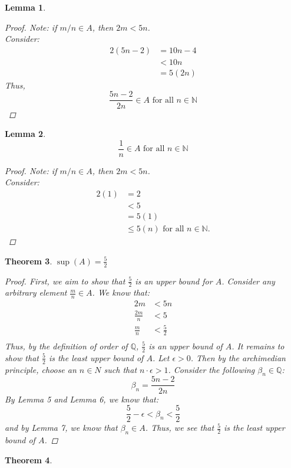 \documentclass{amsart}
\newtheorem{theorem}{Theorem}
\newtheorem{lemma}[theorem]{Lemma}
\begin{document}
\begin{enumerate}[1.]
\begin{lemma}
\[	\]
	\begin{proof}
		Note: if $m/n \in A$, then $2m < 5n$.\\
		Consider:
		\begin{align*}
			2(5n - 2) &= 10n - 4 \\
			&< 10n \\
			&= 5(2n)
		\end{align*}
		Thus, 
		\[
			\frac{5n - 2}{2n} \in A \text{ for all } n \in \mathbb{N}
		\]
	\end{proof}
\end{lemma}
\begin{lemma}
	\[
		\frac{1}{n} \in A \text{ for all } n \in \mathbb{N}	
	\]
	\begin{proof}
		Note: if $m/n \in A$, then $2m < 5n$.\\
		Consider:
		\begin{align*}
			2(1) &= 2 \\
			&< 5 \\
			&= 5(1) \\
			&\leq 5(n) \text{ for all } n \in \mathbb{N}.
		\end{align*}
	\end{proof}
\end{lemma}
\newpage
\begin{theorem}
	$\sup(A) = \frac{5}{2}$
	\begin{proof}
		First, we aim to show that $\frac{5}{2}$ is an upper bound for $A$. Consider
		any arbitrary element $\frac{m}{n} \in A$. We know that:
		\begin{align*}
			2m &< 5n \\
			\frac{2m}{n} &< 5 \\
			\frac{m}{n} &< \frac{5}{2} \\
		\end{align*}
		Thus, by the definition of order of $\mathbb{Q}$, $\frac{5}{2}$ is an upper bound of $A$.
		It remains to show that $\frac{5}{2}$ is the least upper bound of $A$. Let $\epsilon > 0$. 
		Then by the archimedian principle, choose an $n\in N$ such that $n\cdot\epsilon > 1$.
		Consider the following $\beta_n \in\mathbb{Q}$:
		\[
			\beta_n = \frac{5n - 2}{2n}
		\]
		By Lemma 5 and Lemma 6, we know that:
		\[
			\frac{5}{2} - \epsilon < \beta_n < \frac{5}{2}
		\]
		and by Lemma 7, we know that $\beta_n \in A$.
		Thus, we see that $\frac{5}{2}$ is the least upper bound of $A$.
	\end{proof}
\end{theorem}
\begin{theorem}

\end{theorem}
\end{enumerate}
\end{document}
